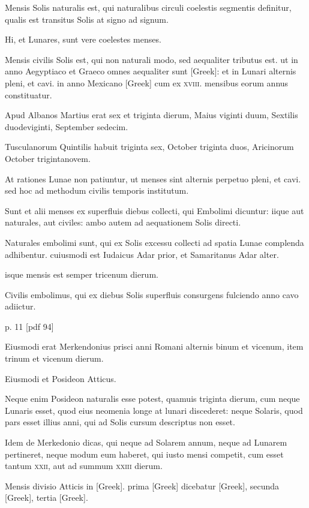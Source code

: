 Mensis Solis naturalis est,
qui naturalibus circuli coelestis segmentis definitur, qualis est transitus
Solis at signo ad signum.

Hi, et Lunares, sunt vere coelestes menses.

Mensis civilis Solis est, qui non naturali modo, sed aequaliter tributus
est. ut in anno Aegyptiaco et Graeco omnes aequaliter sunt \textgreek{[Greek]}:
et in Lunari alternis pleni, et cavi. in anno Mexicano \textgreek{[Greek]}
cum ex \textsc{xviii}. mensibus eorum annus constituatur.

Apud Albanos
Martius erat sex et triginta dierum, Maius viginti duum, Sextilis
duodeviginti, September sedecim.

Tusculanorum Quintilis habuit
triginta sex, October triginta duos, Aricinorum October trigintanovem.

At rationes Lunae non patiuntur, ut menses sint alternis
perpetuo pleni, et cavi. sed hoc ad methodum civilis temporis institutum.

Sunt et alii menses ex superfluis diebus collecti, qui Embolimi
dicuntur: iique aut naturales, aut civiles: ambo autem ad aequationem
Solis directi.

Naturales embolimi sunt, qui ex Solis excessu collecti
ad spatia Lunae complenda adhibentur. cuiusmodi est Iudaicus
Adar prior, et Samaritanus Adar alter.

isque mensis est semper tricenum dierum.

Civilis embolimus, qui ex diebus Solis superfluis consurgens
fulciendo anno cavo adiictur.


p. 11 [pdf 94]

Eiusmodi erat Merkendonius
prisci anni Romani alternis binum et vicenum, item trinum et vicenum
dierum.

Eiusmodi et Posideon Atticus.

Neque enim Posideon
naturalis esse potest, quamuis triginta dierum, cum neque Lunaris
esset, quod eius neomenia longe at lunari discederet: neque Solaris,
quod pars esset illius anni, qui ad Solis cursum descriptus non esset.

Idem de Merkedonio dicas, qui neque ad Solarem annum, neque ad
Lunarem pertineret, neque modum eum haberet, qui iusto mensi
competit, cum esset tantum \textsc{xxii}, aut ad summum \textsc{xxiii} dierum.

Mensis divisio Atticis in \textgreek{[Greek]}.
 prima \textgreek{[Greek]} dicebatur \textgreek{[Greek]},
secunda \textgreek{[Greek]}, tertia \textgreek{[Greek]}.

